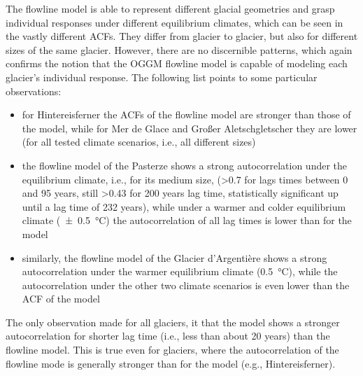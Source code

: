       The flowline model is able to represent different glacial geometries and grasp individual responses under different equilibrium climates, which can be seen in the vastly different ACFs. They differ from glacier to glacier, but also for different sizes of the same glacier. However, there are no discernible patterns, which again confirms the notion that the OGGM flowline model is capable of modeling each glacier's individual response. The following list points to some particular observations:
      \begin{itemize}
        \item for Hintereisferner the ACFs of the flowline model are stronger than those of the \vas{} model, while for Mer de Glace and Großer Aletschgletscher they are lower (for all tested climate scenarios, i.e., all different sizes)
        \item the flowline model of the Pasterze shows a strong autocorrelation under the equilibrium climate, i.e., for its medium size, (>0.7 for lags times between 0 and 95 years, still >0.43 for 200 years lag time, statistically significant up until a lag time of 232 years), while under a warmer and colder equilibrium climate (\SI{\pm0.5}{\celsius}) the autocorrelation of all lag times is lower than for the \vas{} model
        \item similarly, the flowline model of the Glacier d'Argentière shows a strong autocorrelation under the warmer equilibrium climate (\SI{+0.5}{\celsius}), while the autocorrelation under the other two climate scenarios is even lower than the ACF of the \vas{} model
      \end{itemize}
      The only observation made for all glaciers, it that the \vas{} model shows a stronger autocorrelation for shorter lag time (i.e., less than about 20 years) than the flowline model. This is true even for glaciers, where the autocorrelation of the flowline mode is generally stronger than for the \vas{} model (e.g., Hintereisferner).

